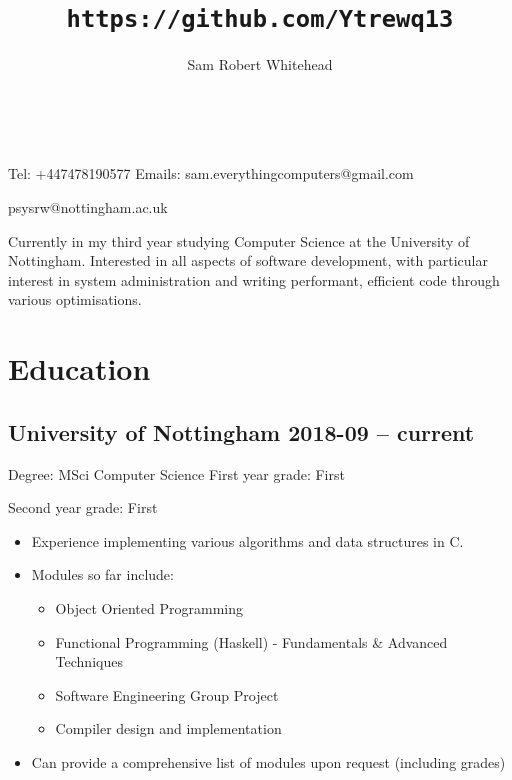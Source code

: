 \documentclass[10pt]{extarticle}
\renewcommand{\maketitle}{
    {
    \centering
        \huge\bfseries\theauthor{}\\
        \Large\thetitle{}\par
    }
}
\begin{document}
\title{\texttt{https://github.com/Ytrewq13}}
\author{Sam Robert Whitehead}

\maketitle

\pagestyle{empty}

Tel: +447478190577
\hfill
Emails: sam.everythingcomputers@gmail.com\\
{\raggedleft psysrw@nottingham.ac.uk\par}
\vspace{1mm}
Currently in my third year studying Computer Science at the University of
Nottingham. Interested in all aspects of software development, with
particular interest in system administration and writing performant,
efficient code through various optimisations.
\section{Education}
    \subsection{University of Nottingham
        \hfill 2018-09 -- current}
        Degree: MSci Computer Science
        \hfill
        First year grade: First\\
        {\raggedleft Second year grade: First\par}
        \begin{itemize}
            \item Experience implementing various algorithms and data structures in
                C.
            \item Modules so far include:
                \begin{itemize}
                    \item Object Oriented Programming
                    \item Functional Programming (Haskell) - Fundamentals \&
                        Advanced Techniques
                    \item Software Engineering Group Project
                    \item Compiler design and implementation
                \end{itemize}
            \item Can provide a comprehensive list of modules upon request
                (including grades)
        \end{itemize}
\end{document}
